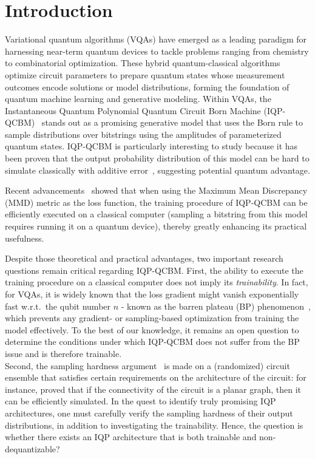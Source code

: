 \documentclass[10pt, twocolumn, a4paper]{article}
\theoremstyle{plain}
\theoremstyle{definition}
\theoremstyle{remark}
\begin{document}
\section{Introduction}
Variational quantum algorithms (VQAs) have emerged as a leading paradigm for harnessing near-term quantum devices to tackle problems ranging from chemistry to combinatorial optimization. These hybrid quantum-classical algorithms optimize circuit parameters to prepare quantum states whose measurement outcomes encode solutions or model distributions, forming the foundation of quantum machine learning and generative modeling.
Within VQAs, the Instantaneous Quantum Polynomial Quantum Circuit Born Machine (IQP-QCBM)~\cite{shepherd09,Liu18} stands out as a promising generative model that uses the Born rule to sample distributions over bitstrings using the amplitudes of parameterized quantum states. IQP-QCBM is particularly interesting to study because it has been proven that the output probability distribution of this model can be hard to simulate classically with additive error~\cite{Bremner10, Bremner16}, suggesting potential quantum advantage.

Recent advancements~\cite{recioarmengol25} showed that when using the Maximum Mean Discrepancy (MMD) metric as the loss function, the training procedure of IQP-QCBM can be efficiently executed on a classical computer (sampling a bitstring from this model requires running it on a quantum device), thereby greatly enhancing its practical usefulness.

Despite those theoretical and practical advantages, two important research questions remain critical regarding IQP-QCBM. First, the ability to execute the training procedure on a classical computer does not imply its \emph{trainability}. In fact, for VQAs, it is widely known that the loss gradient might vanish exponentially fast w.r.t.~the qubit number $n$ - known as the barren plateau (BP) phenomenon~\cite{mcclean18,Cerezo21,Holmes22,Larocca25}, which prevents any gradient- or sampling-based optimization from training the model effectively. To the best of our knowledge, it remains an open question to determine the conditions under which IQP-QCBM does not suffer from the BP issue and is therefore trainable. \\
Second, the sampling hardness argument~\cite{Bremner10,Bremner16,Bremner17} is made on a (randomized) circuit ensemble that satisfies certain requirements on the architecture of the circuit: for instance, \citet{Fujii17} proved that if the connectivity of the circuit is a planar graph, then it can be efficiently simulated. In the quest to identify truly promising IQP architectures, one must carefully verify the sampling hardness of their output distributions, in addition to investigating the trainability. Hence, the question is whether there exists an IQP architecture that is both trainable and non-dequantizable?
\end{document}
